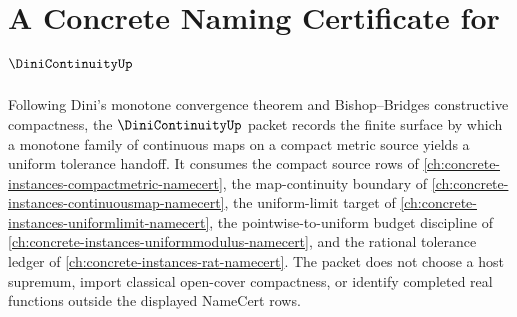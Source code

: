 \chapter{A Concrete Naming Certificate for $\DiniContinuityUp$}
\label{ch:concrete-instances-dini-continuity-namecert}

Following Dini's monotone convergence theorem and Bishop--Bridges constructive compactness, the $\DiniContinuityUp$ packet records the finite surface by which a monotone family of continuous maps on a compact metric source yields a uniform tolerance handoff. It consumes the compact source rows of \autoref{ch:concrete-instances-compactmetric-namecert}, the map-continuity boundary of \autoref{ch:concrete-instances-continuousmap-namecert}, the uniform-limit target of \autoref{ch:concrete-instances-uniformlimit-namecert}, the pointwise-to-uniform budget discipline of \autoref{ch:concrete-instances-uniformmodulus-namecert}, and the rational tolerance ledger of \autoref{ch:concrete-instances-rat-namecert}. The packet does not choose a host supremum, import classical open-cover compactness, or identify completed real functions outside the displayed NameCert rows.

